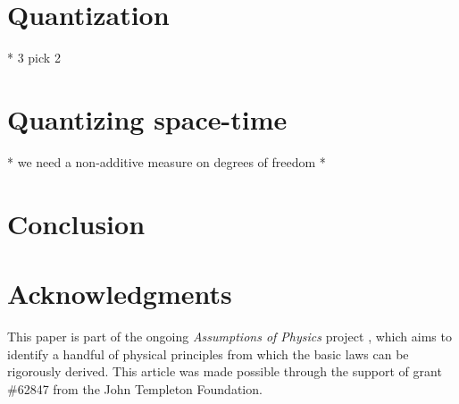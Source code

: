 \documentclass[10pt,twocolumn, nofootinbib]{revtex4-2}
\begin{document}
\section{Quantization}
* 3 pick 2

\section{Quantizing space-time}
* we need a non-additive measure on degrees of freedom
*

\section{Conclusion}



\section*{Acknowledgments}
This paper is part of the ongoing \textit{Assumptions of Physics} project \cite{aop-book}, which aims to identify a handful of physical principles from which the basic laws can be rigorously derived. This article was made possible through the support of grant \#62847 from the John Templeton Foundation.




\newcommand{\pj}[1] {\underbar{$#1$}}
\end{document}
